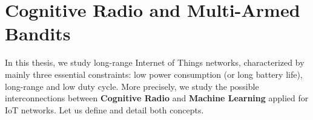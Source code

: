 

\section{Cognitive Radio and Multi-Armed Bandits}

In this thesis, we study long-range Internet of Things networks, characterized by mainly three essential constraints:
low power consumption (or long battery life),
long-range
and low duty cycle.
%
More precisely, we study the possible interconnections between \textbf{Cognitive Radio} and \textbf{Machine Learning} applied for IoT networks.
Let us define and detail both concepts.





